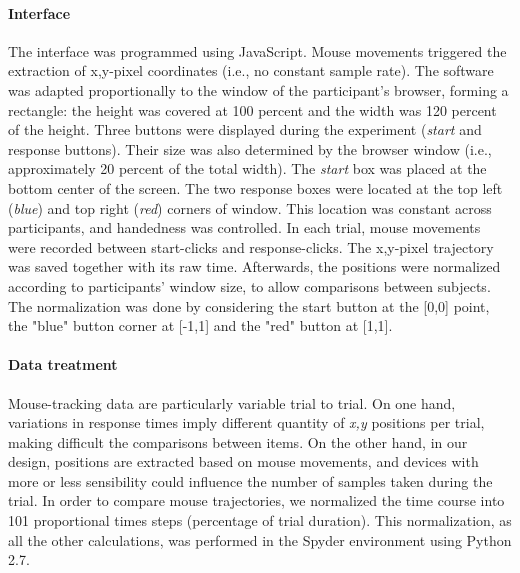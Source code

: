 \documentclass{article}
\begin{document}
\paragraph{Interface}
The interface was programmed using JavaScript. Mouse movements triggered the extraction of x,y-pixel coordinates (i.e., no constant sample rate). The software was adapted proportionally to the window of the participant's browser, forming a rectangle: the height was covered at 100 percent and the width was 120 percent of the height. 
Three buttons were displayed during the experiment (\textit{start} and response buttons). Their size was also determined by the browser window (i.e., approximately 20 percent of the total width). The \textit{start} box was placed at the bottom center of the screen. The two response boxes were located at the top left (\textit{blue}) and top right (\textit{red}) corners of window. This location was constant across participants, and handedness was controlled.  
In each trial, mouse movements were recorded between start-clicks and response-clicks. The x,y-pixel trajectory was saved together with its raw time. Afterwards, the positions were normalized according to participants' window size, to allow comparisons between subjects. The normalization was done by considering the start button at the [0,0] point, the "blue" button corner at [-1,1] and the "red" button at [1,1]. 

\paragraph{Data treatment}
Mouse-tracking data are particularly variable trial to trial. On one hand, variations in response times imply different quantity of \textit{x,y} positions per trial, making difficult the comparisons between items. On the other hand, in our design, positions are extracted based on mouse movements, and devices with more or less sensibility could influence the number of samples taken during the trial. In order to compare mouse trajectories, we normalized the time course into 101 proportional times steps (percentage of trial duration). This normalization, as all the other calculations, was performed in the Spyder environment using Python 2.7. 
\end{document}

